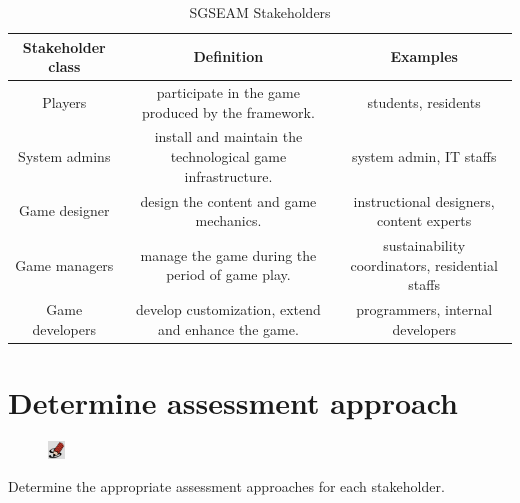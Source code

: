 \documentclass[11pt,oneside]{book}
\newcommand\tabhead[1]{\small\textbf{#1}}
\begin{document}
\begin{table}[ht!]
  \centering
  \begin{tabular}{|c|c|c|}
    \hline
    \multicolumn{1}{|p{0.22\columnwidth}|}{\centering\tabhead{Stakeholder class}} &
    \multicolumn{1}{|p{0.4\columnwidth}|}{\centering\tabhead{Definition}} &
    \multicolumn{1}{|p{0.28\columnwidth}|}{\centering\tabhead{Examples}} \\
    \hline
    \multicolumn{1}{|p{0.22\columnwidth}|}{Players} &
    \multicolumn{1}{|p{0.4\columnwidth}|}{participate in the game produced by the framework.} &
    \multicolumn{1}{|p{0.28\columnwidth}|}{students, residents} \\
    \hline
    \multicolumn{1}{|p{0.22\columnwidth}|}{System admins} &
    \multicolumn{1}{|p{0.4\columnwidth}|}{install and maintain the technological game infrastructure.} &
    \multicolumn{1}{|p{0.28\columnwidth}|}{system admin, IT staffs} \\
    \hline
    \multicolumn{1}{|p{0.22\columnwidth}|}{Game designer} &
    \multicolumn{1}{|p{0.4\columnwidth}|}{design the content and game mechanics.} &
    \multicolumn{1}{|p{0.28\columnwidth}|}{instructional designers, content experts} \\
    \hline
    \multicolumn{1}{|p{0.22\columnwidth}|}{Game managers} &
    \multicolumn{1}{|p{0.4\columnwidth}|}{manage the game during the period of game play.} &
    \multicolumn{1}{|p{0.28\columnwidth}|}{sustainability coordinators, residential staffs} \\
    \hline
    \multicolumn{1}{|p{0.22\columnwidth}|}{Game developers} &
    \multicolumn{1}{|p{0.4\columnwidth}|}{develop customization, extend and enhance the game.} &
    \multicolumn{1}{|p{0.28\columnwidth}|}{programmers, internal developers} \\
    \hline
  \end{tabular}
  \caption{SGSEAM Stakeholders}
  \label{table:stakeholders}
\end{table}

\section{Determine assessment approach}

\begin{shadebox}
\begin{figure}
\vspace{-15pt}\hspace{-10pt}
    \includegraphics[width=0.04\textwidth]{note-icon}
\end{figure}
Determine the appropriate assessment approaches for each stakeholder.
\end{shadebox}
\end{document}
